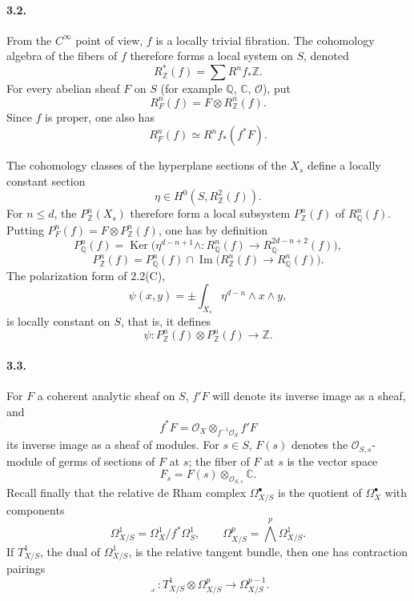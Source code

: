 \documentclass[10pt]{article}
\newcommand{\C}{\mathbb C}
\newcommand{\Z}{\mathbb Z}
\newcommand{\Q}{\mathbb Q}
\newcommand{\cO}{\mathcal O}
\newcommand{\Ker}{\operatorname{Ker}}
\newcommand{\Imop}{\operatorname{Im}}
\theoremstyle{deligne}
\begin{document}
\paragraph{3.2.}
From the $C^\infty$ point of view, $f$ is a locally trivial fibration. The cohomology algebra of the fibers of $f$ therefore forms a local system on $S$, denoted
\[
R_\Z^*(f)=\sum R^n f_*\Z .
\]
For every abelian sheaf $F$ on $S$ (for example $\Q$, $\C$, $\cO$), put
\begin{equation}
R_F^n(f)=F\otimes R_\Z^n(f).
\tag{3.2.1}
\end{equation}
Since $f$ is proper, one also has
\[
R_F^n(f)\simeq R^n f_*(f^*F).
\]

The cohomology classes of the hyperplane sections of the $X_s$ define a locally constant section
\begin{equation}
\eta\in H^0(S,R_\Z^2(f)).
\tag{3.2.2}
\end{equation}
For $n\le d$, the $P_\Z^n(X_s)$ therefore form a local subsystem $P_\Z^n(f)$ of $R_\Q^n(f)$. Putting $P_F^n(f)=F\otimes P_\Z^n(f)$, one has by definition
\begin{equation}
P_\Q^n(f)=\Ker\bigl(\eta^{d-n+1}\wedge:R_\Q^n(f)\to R_\Q^{2d-n+2}(f)\bigr),
\tag{3.2.3}
\end{equation}
\begin{equation}
P_\Z^n(f)=P_\Q^n(f)\cap \Imop\bigl(R_\Z^n(f)\to R_\Q^n(f)\bigr).
\tag{3.2.4}
\end{equation}
The polarization form of 2.2(C),
\begin{equation}
\psi(x,y)=\pm\int_{X_s}\eta^{d-n}\wedge x\wedge y,
\tag{3.2.5}
\end{equation}
is locally constant on $S$, that is, it defines
\begin{equation}
\psi:P_\Z^n(f)\otimes P_\Z^n(f)\longrightarrow \Z .
\tag{3.2.6}
\end{equation}

\paragraph{3.3.}
For $F$ a coherent analytic sheaf on $S$, $f'F$ will denote its inverse image as a sheaf, and
\[
f^*F=\cO_X\otimes_{f^{-1}\cO_S}f'F
\]
its inverse image as a sheaf of modules. For $s\in S$, $F(s)$ denotes the $\cO_{S,s}$-module of germs of sections of $F$ at $s$; the fiber of $F$ at $s$ is the vector space
\[
F_s=F(s)\otimes_{\cO_{S,s}}\C .
\]
Recall finally that the relative de Rham complex $\Omega_{X/S}^\bullet$ is the quotient of $\Omega_X^\bullet$ with components
\[
\Omega^1_{X/S}=\Omega_X^1/f^*\Omega_S^1,
\qquad
\Omega^p_{X/S}=\bigwedge^p\Omega_{X/S}^1 .
\]
If $T^1_{X/S}$, the dual of $\Omega^1_{X/S}$, is the relative tangent bundle, then one has contraction pairings
\begin{equation}
\lrcorner:T^1_{X/S}\otimes\Omega^p_{X/S}\longrightarrow\Omega^{p-1}_{X/S}.
\tag{3.3.1}
\end{equation}
\end{document}
